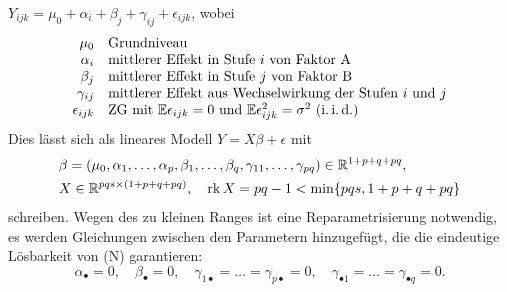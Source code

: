 \documentclass{cheat-sheet}
\newcommand{\E}{\mathbb{E}} %
\newcommand{\iid}{i.\,i.\,d.} %
\DeclareMathOperator{\rk}{rk} %
\begin{document}
\begin{modell}
  $Y_{ijk} = \mu_0 + \alpha_i + \beta_j + \gamma_{ij} + \epsilon_{ijk}$, \enspace wobei
  \[
    \begin{array}{r l}
      \mu_0 & \text{Grundniveau} \\
      \alpha_i & \text{mittlerer Effekt in Stufe~$i$ von Faktor~A} \\
      \beta_j & \text{mittlerer Effekt in Stufe~$j$ von Faktor~B} \\
      \gamma_{ij} & \text{mittlerer Effekt aus Wechselwirkung der Stufen $i$ und $j$} \\
      \epsilon_{ijk} & \text{ZG mit $\E \epsilon_{ijk} = 0$ und $\E \epsilon_{ijk}^2 = \sigma^2$ (\iid{})}
    \end{array}
  \]
  Dies lässt sich als lineares Modell $Y = X \beta + \epsilon$ mit
  \begin{align*}
    & \beta = (\mu_0, \alpha_1, \ldots, \alpha_p, \beta_1, \ldots, \beta_q, \gamma_{11}, \ldots, \gamma_{pq}) \in \R^{1+p+q+pq}, \\
    & X \in \R^{pqs \times (1+p+q+pq)}, \quad
    \rk X = pq - 1 < \min \{ pqs, 1 + p + q + pq \}
  \end{align*}
  schreiben.
  Wegen des zu kleinen Ranges ist eine Reparametrisierung notwendig, \dh{} es werden Gleichungen zwischen den Parametern hinzugefügt, die die eindeutige Lösbarkeit von (N) garantieren:
  \[
    \alpha_\bullet = 0, \quad
    \beta_\bullet = 0, \quad
    \gamma_{1 \bullet} = \ldots = \gamma_{p \bullet} = 0, \quad
    \gamma_{\bullet 1} = \ldots = \gamma_{\bullet q} = 0.
  \]
  \iffalse
    Diese Bedingungen bedeuten keine Einschränkung der Allgemeinheit der Darstellung $Y_{ijk} = \mu_0 + \alpha_i + \beta_j + \gamma_{ij} + \epsilon_{ijk}$ denn:
    $\mu_0^* = \mu_0 + \overline{\alpha}_\bullet + \overline{\beta}_\bullet + \overline{\gamma}_\bullet$,
    $\alpha_i^* = \alpha_i - \overline{\alpha}_\bullet + \overline{\gamma}_{i \bullet} - \overline{\gamma}_{\bullet \bullet}$,
    $\beta_j^* = \beta_j - \overline{\beta}_\bullet + \overline{\gamma}_{\bullet j} - \overline{\gamma}_{\bullet \bullet}$ und
    $\gamma_{ij}^* = \gamma_{ij} - \overline{\gamma_{i \bullet}} - \overline{\gamma_{\bullet j}} + \overline{\gamma}_{\bullet \bullet}$
    für $i = 1, \ldots, p$, $j = 1, \ldots, q$.
    Es ergeben sich die Gleichungen
    $Y_{ijk} = \mu_0^* + \alpha_i^* + \beta_j^* + \gamma_{ij}^* + \epsilon_{ijk}$ für $i = 1, \ldots, p$, $j = 1, \ldots, q$, $k = 1, \ldots, s$
  \fi
\end{modell}
\end{document}
